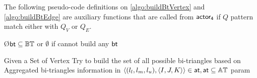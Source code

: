 The following pseudo-code definitions on \autoref{algo:buildBtVertex} and \autoref{algo:buildBtEdge} are auxiliary functions that are called
from $\mathsf{actor_4}$ if $Q$ pattern match either with $Q_V$ or $Q_E$.

\begin{algorithm}
\O{$\mathsf{bt} \subseteq \mathbb{BT}$ or $\emptyset$ if cannot build any $\mathsf{bt}$}
\caption{Given a Set of Vertex Try to build the set of all possible bi-triangles based on Aggregated bi-triangles information in $\left\langle (l_l, l_m, l_u), \left\langle I,J,K \right\rangle \right\rangle \in \mathsf{at}, \mathsf{at} \subseteq \mathbb{AT}$ param}
\label{algo:buildBtVertex}
\end{algorithm}

